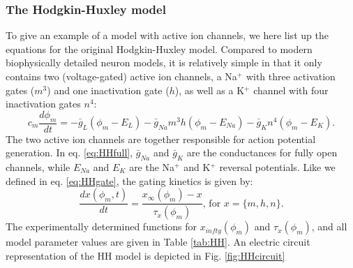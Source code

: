 \subsubsection{The Hodgkin-Huxley model}
To give an example of a model with active ion channels, we here list up the equations for the original Hodgkin-Huxley model. Compared to modern biophysically detailed neuron models, it is relatively simple in that it only contains two (voltage-gated) active ion channels, a Na$^+$ with three activation gates ($m^3$) and one inactivation gate ($h$), as well as a K$^+$ channel with four inactivation gates $n^4$:
\begin{equation}
c_m \frac{d\phi_m}{dt} = -\bar{g}_L(\phi_m-E_L) - \bar{g}_{Na} m^3 h (\phi_m - E_{Na}) - \bar{g}_{K} n^4 (\phi_m - E_{K}).
\label{eq:HHfull}
\end{equation}
The two active ion channels are together responsible for action potential generation. In eq. \ref{eq:HHfull}, $\bar{g}_{Na}$ and $\bar{g}_K$ are the conductances for fully open channels, while $E_{Na}$ and $E_{K}$ are the Na$^+$ and K$^+$ reversal potentials. Like we defined in eq. \ref{eq:HHgate}, the gating kinetics is given by: 
\begin{equation}
\frac{dx(\phi_m,t)}{dt} = \frac{x_{\infty}(\phi_m) - x}{\tau_x(\phi_m)},  \, \text{for } x = \{m,h,n\}.
\label{eq:HHgates}
\end{equation}
The experimentally determined functions for $x_{infty}(\phi_m)$ and $\tau_x(\phi_m)$, and all model parameter values are given in Table \ref{tab:HH}. An electric circuit representation of the HH model is depicted in Fig. \ref{fig:HHcircuit}


